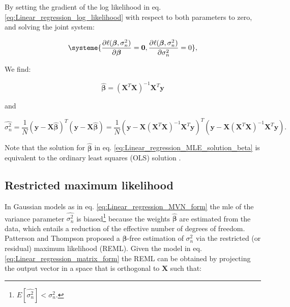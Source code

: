 By setting the gradient of the log likelihood in eq. \eqref{eq:Linear_regression_log_likelihood} with respect to both parameters to zero, and solving the joint system:

\begin{equation} \label{eq:Linear_regression_MLE_system}
\systeme{
    \dfrac{\partial \ell(\boldsymbol{\beta}, \sigma_n^2)}{\partial \boldsymbol{\beta}} = \mathbf{0},
    \dfrac{\partial \ell(\boldsymbol{\beta}, \sigma_n^2)}{\partial \sigma_n^2} = 0
    },
\end{equation}

We find:

\begin{equation} \label{eq:Linear_regression_MLE_solution_beta}
\hat{\boldsymbol{\beta}} = (\mathbf{X}^T\mathbf{X})^{-1}\mathbf{X}^T\mathbf{y} 
\end{equation}

and

\begin{equation} \label{eq:Linear_regression_MLE_solution_sigma}
 \hat{\sigma_n^2} = \frac{1}{N}(\mathbf{y}-\mathbf{X}\hat{\boldsymbol{\beta}})^T(\mathbf{y}-\mathbf{X}\hat{\boldsymbol{\beta}}) = \frac{1}{N}(\mathbf{y}-\mathbf{X}(\mathbf{X}^T\mathbf{X})^{-1}\mathbf{X}^T\mathbf{y})^T(\mathbf{y}-\mathbf{X}(\mathbf{X}^T\mathbf{X})^{-1}\mathbf{X}^T\mathbf{y}). 
\end{equation}

Note that the solution for $\hat{\boldsymbol{\beta}}$ in eq. \eqref{eq:Linear_regression_MLE_solution_beta} is equivalent to the ordinary least squares (OLS) solution \cite{hayashi2000econometrics}.

\newpage

\subsection{Restricted maximum likelihood}


In Gaussian models as in eq. \eqref{eq:Linear_regression_MVN_form} the \gls{mle} of the variance parameter $\hat{\sigma_n^2}$ is biased\footnote{$E[\hat{\sigma_n^2}] < \sigma_n^2$.} because the weights $\hat{\boldsymbol{\beta}}$ are estimated from the data, which entails a reduction of the effective number of degrees of freedom.
Patterson and Thompson \cite{patterson1971recovery} proposed a $\boldsymbol{\beta}$-free estimation of $\sigma_n^2$ via the restricted (or residual) maximum likelihood (REML).
Given the model in eq. \eqref{eq:Linear_regression_matrix_form} the REML can be obtained by projecting the output vector in a space that is orthogonal to $\mathbf{X}$ such that:

